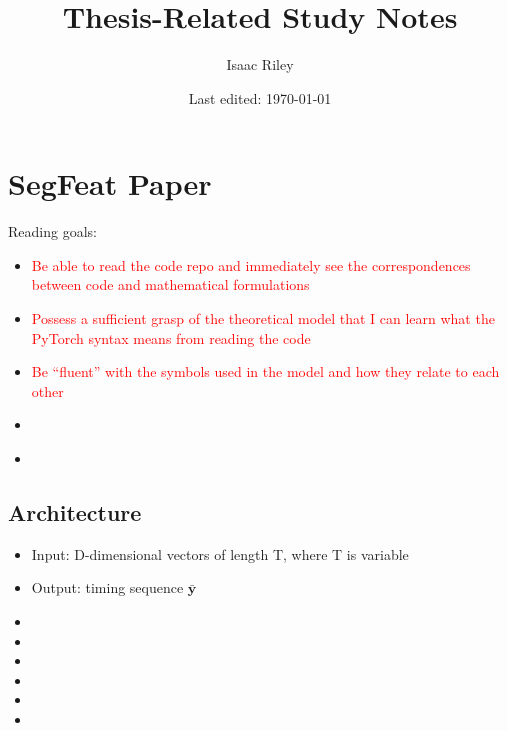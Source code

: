 \documentclass[a4paper]{article}
\title{Thesis-Related Study Notes}
\author{Isaac Riley}
\date{Last edited: \today}
\newcommand{\followup}[1]{\textcolor{red}{ #1 }}
\begin{document}
\maketitle
\tableofcontents
\newpage


\section{SegFeat Paper}
Reading goals:
\begin{itemize}
    \item \followup{Be able to read the code repo and immediately see the correspondences between code and mathematical formulations}
    \item \followup{Possess a sufficient grasp of the theoretical model that I can learn what the PyTorch syntax means from reading the code}
    \item \followup{Be ``fluent'' with the symbols used in the model and how they relate to each other}
    \item \followup{}
    \item \followup{}
\end{itemize}
\subsection{Architecture}
\begin{itemize}
    \item Input: D-dimensional vectors of length T, where T is variable
    \item Output: timing sequence $\bar{\textbf{y}}$
    \item 
    \item 
    \item 
    \item 
    \item 
    \item 
\end{itemize}
\subsection{}

\subsection{}
\end{document}
